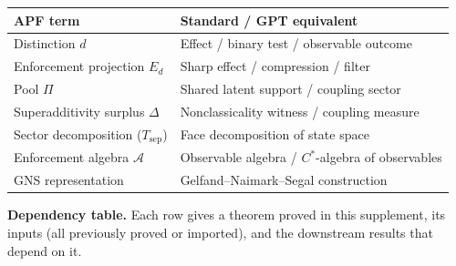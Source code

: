 \documentclass[11pt,a4paper]{article}
\theoremstyle{definition}
\begin{document}
\smallskip
\begin{center}\small
\renewcommand{\arraystretch}{1.15}
\begin{tabular}{@{}ll@{}}
\toprule
\textbf{APF term} & \textbf{Standard / GPT equivalent} \\
\midrule
Distinction $d$ & Effect / binary test / observable outcome \\
Enforcement projection $E_d$ & Sharp effect / compression / filter \\
Pool $\Pi$ & Shared latent support / coupling sector \\
Superadditivity surplus $\Delta$ & Nonclassicality witness / coupling measure \\
Sector decomposition ($T_{\mathrm{sep}}$) & Face decomposition of state space \\
Enforcement algebra $\mathcal{A}$ & Observable algebra / $C^*$-algebra of observables \\
GNS representation & Gelfand--Naimark--Segal construction \\
\bottomrule
\end{tabular}
\end{center}



\medskip\noindent\textbf{Dependency table.}  Each row gives a theorem proved in this supplement, its inputs (all previously proved or imported), and the downstream results that depend on it.
\end{document}
